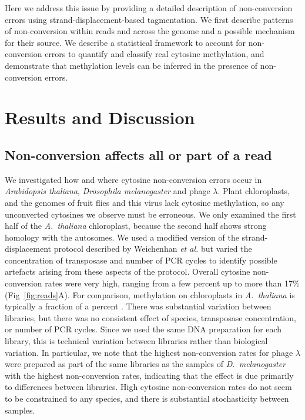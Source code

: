 \documentclass[10pt,letterpaper,draft]{article}
\begin{document}
Here we address this issue by providing a detailed description of non-conversion errors using strand-displacement-based tagmentation.
We first describe patterns of non-conversion within reads and across the genome and a possible mechanism for their source.
We describe a statistical framework to account for non-conversion errors to quantify and classify real cytosine methylation, and demonstrate that methylation levels can be inferred in the presence of non-conversion errors.

\section*{Results and Discussion}

\subsection*{Non-conversion affects all or part of a read}

We investigated how and where cytosine non-conversion errors occur in \textit{Arabidopsis thaliana}, \textit{Drosophila melanogaster} and phage $\lambda$.
Plant chloroplasts, and the genomes of fruit flies and this virus lack cytosine methylation, so any unconverted cytosines we observe must be erroneous.
We only examined the first half of the \textit{A.~thaliana} chloroplast, because the second half shows strong homology with the autosomes.
We used a modified version of the strand-displacement protocol described by Weichenhan \textit{et al.} \cite{weichenhan2019generation} but varied the concentration of transposase and number of PCR cycles to identify possible artefacts arising from these aspects of the protocol.
Overall cytosine non-conversion rates were very high, ranging from a few percent up to more than 17\% (Fig~\ref{fig:reads}A).
For comparison, methylation on chloroplasts in \textit{A.~thaliana} is typically a fraction of a percent \cite{zhang2018large}.
There was substantial variation between libraries, but there was no consistent effect of species, transposase concentration, or number of PCR cycles.
Since we used the same DNA preparation for each library, this is technical variation between libraries rather than biological variation.
In particular, we note that the highest non-conversion rates for phage $\lambda$ were prepared as part of the same libraries as the samples of \textit{D.~melanogaster} with the highest non-conversion rates, indicating that the effect is due primarily to differences between libraries.
High cytosine non-conversion rates do not seem to be constrained to any species, and there is substantial stochasticity between samples.
\end{document}
